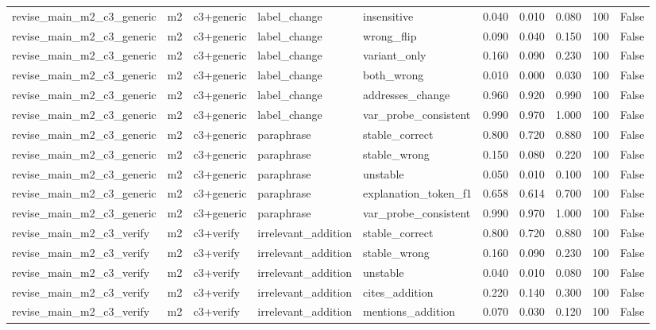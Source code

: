 \begin{tabular}{llllllllll}
revise\_main\_m2\_c3\_generic & m2 & c3+generic & label\_change & insensitive & 0.040 & 0.010 & 0.080 & 100 & False \\
revise\_main\_m2\_c3\_generic & m2 & c3+generic & label\_change & wrong\_flip & 0.090 & 0.040 & 0.150 & 100 & False \\
revise\_main\_m2\_c3\_generic & m2 & c3+generic & label\_change & variant\_only & 0.160 & 0.090 & 0.230 & 100 & False \\
revise\_main\_m2\_c3\_generic & m2 & c3+generic & label\_change & both\_wrong & 0.010 & 0.000 & 0.030 & 100 & False \\
revise\_main\_m2\_c3\_generic & m2 & c3+generic & label\_change & addresses\_change & 0.960 & 0.920 & 0.990 & 100 & False \\
revise\_main\_m2\_c3\_generic & m2 & c3+generic & label\_change & var\_probe\_consistent & 0.990 & 0.970 & 1.000 & 100 & False \\
revise\_main\_m2\_c3\_generic & m2 & c3+generic & paraphrase & stable\_correct & 0.800 & 0.720 & 0.880 & 100 & False \\
revise\_main\_m2\_c3\_generic & m2 & c3+generic & paraphrase & stable\_wrong & 0.150 & 0.080 & 0.220 & 100 & False \\
revise\_main\_m2\_c3\_generic & m2 & c3+generic & paraphrase & unstable & 0.050 & 0.010 & 0.100 & 100 & False \\
revise\_main\_m2\_c3\_generic & m2 & c3+generic & paraphrase & explanation\_token\_f1 & 0.658 & 0.614 & 0.700 & 100 & False \\
revise\_main\_m2\_c3\_generic & m2 & c3+generic & paraphrase & var\_probe\_consistent & 0.990 & 0.970 & 1.000 & 100 & False \\
revise\_main\_m2\_c3\_verify & m2 & c3+verify & irrelevant\_addition & stable\_correct & 0.800 & 0.720 & 0.880 & 100 & False \\
revise\_main\_m2\_c3\_verify & m2 & c3+verify & irrelevant\_addition & stable\_wrong & 0.160 & 0.090 & 0.230 & 100 & False \\
revise\_main\_m2\_c3\_verify & m2 & c3+verify & irrelevant\_addition & unstable & 0.040 & 0.010 & 0.080 & 100 & False \\
revise\_main\_m2\_c3\_verify & m2 & c3+verify & irrelevant\_addition & cites\_addition & 0.220 & 0.140 & 0.300 & 100 & False \\
revise\_main\_m2\_c3\_verify & m2 & c3+verify & irrelevant\_addition & mentions\_addition & 0.070 & 0.030 & 0.120 & 100 & False \\

\end{tabular}
